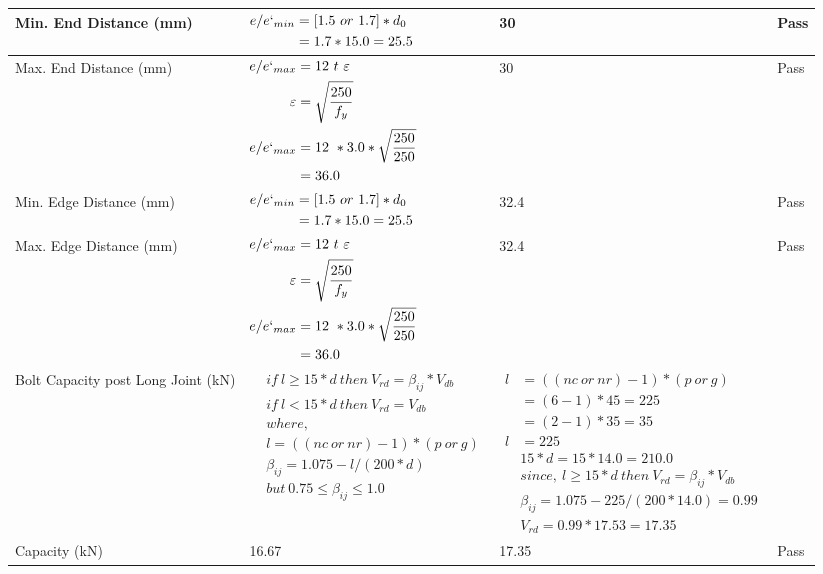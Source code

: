 \documentclass{article}%
\begin{document}
\begin{longtable}{|p{2.5cm}|p{5.5cm}|p{7cm}|p{1cm}|}
\hline%
Min. End Distance (mm)&$\begin{aligned}e/e`_{min} &=[1.5~or~ 1.7] * d_0\\ &=1.7*15.0=25.5 \end{aligned}$&30&Pass\\%
\hline%
Max. End Distance (mm)&$\begin{aligned}e/e`_{max} &= 12~ t~ \varepsilon&\\ \varepsilon &= \sqrt{\frac{250}{f_y}}\\ e/e`_{max}&=12 ~*3.0*\sqrt{\frac{250}{250}}\\ &=36.0\\ \end{aligned}$&30&Pass\\%
\hline%
Min. Edge Distance (mm)&$\begin{aligned}e/e`_{min} &=[1.5~or~ 1.7] * d_0\\ &=1.7*15.0=25.5 \end{aligned}$&32.4&Pass\\%
\hline%
Max. Edge Distance (mm)&$\begin{aligned}e/e`_{max} &= 12~ t~ \varepsilon&\\ \varepsilon &= \sqrt{\frac{250}{f_y}}\\ e/e`_{max}&=12 ~*3.0*\sqrt{\frac{250}{250}}\\ &=36.0\\ \end{aligned}$&32.4&Pass\\%
\hline%
Bolt Capacity post Long Joint (kN)&$\begin{aligned} &if~l\geq 15 * d~then~V_{rd} = \beta_{ij} * V_{db} \\ & if~l < 15 * d~then~V_{rd} = V_{db} \\ & where,\\ & l = ((nc~or~nr) - 1) * (p~or~g) \\ & \beta_{ij} = 1.075 - l/(200 * d) \\ & but~0.75\leq\beta_{ij}\leq1.0 \end{aligned}$&$\begin{aligned} l&= ((nc~or~nr) - 1) * (p~or~g) \\  &= (6 - 1) * 45=225\\  &= (2 - 1) * 35=35\\  l&= 225\\ & 15 * d = 15 * 14.0 = 210.0 \\ & since,~l \geq 15 * d~then~V_{rd} = \beta_{ij} * V_{db} \\ & \beta_{ij} = 1.075 - 225/(200*14.0) =0.99\\ & V_{rd} = 0.99 * 17.53=17.35 \end{aligned}$&\\%
\hline%
Capacity (kN)&16.67&17.35&Pass\\%
\hline%
\end{longtable}
\end{document}
